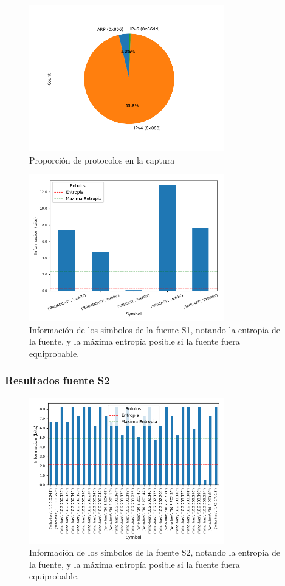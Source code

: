 \begin{figure}[H]
  \centering
  \includegraphics[width=8.5cm]{figs/protocols_proportion_labo6_2018_04_18_S1_output.png}
  \caption{\normalfont Proporción de protocolos en la captura}
\end{figure}

\begin{figure}[H]
  \centering
  \includegraphics[width=8.5cm]{figs/information_labo6_2018_04_18_S1_output.png}
  \caption{\normalfont Información de los símbolos de la fuente S1, notando la entropía de la fuente, y la máxima entropía posible si la fuente fuera equiprobable.}
\end{figure}

\subsubsection*{Resultados fuente S2}

\begin{figure}[H]
  \centering
  \includegraphics[width=8.5cm]{figs/information_labo6_2018_04_18_S2_output.png}
  \caption{\normalfont Información de los símbolos de la fuente S2, notando la entropía de la fuente, y la máxima entropía posible si la fuente fuera equiprobable.}
\end{figure}

